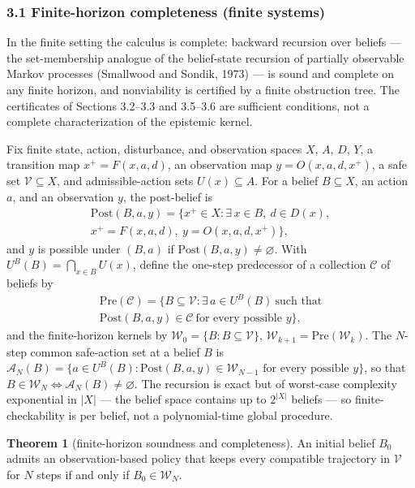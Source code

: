 \documentclass[10pt,twocolumn]{article}
\theoremstyle{definition}
\newtheorem{theorem}{Theorem}
\begin{document}
\subsubsection{3.1 Finite-horizon completeness (finite systems)}\label{finite-horizon-completeness}

In the finite setting the calculus is complete: backward recursion over beliefs --- the set-membership analogue of the belief-state recursion of partially observable Markov processes (Smallwood and Sondik, 1973) --- is sound and complete on any finite horizon, and nonviability is certified by a finite obstruction tree. The certificates of Sections 3.2--3.3 and 3.5--3.6 are sufficient conditions, not a complete characterization of the epistemic kernel.

Fix finite state, action, disturbance, and observation spaces \(X\),
\(A\), \(D\), \(Y\), a transition map \(x^+ = F(x,a,d)\), an observation
map \(y = O(x,a,d,x^+)\), a safe set \(\mathcal V\subseteq X\), and
admissible-action sets \(U(x)\subseteq A\). For a belief \(B\subseteq X\),
an action \(a\), and an observation \(y\), the post-belief is
\[
\begin{gathered}
\mathrm{Post}(B,a,y) = \bigl\{ x^+\in X : \exists\, x\in B,\ d\in D(x), \\
x^+ = F(x,a,d),\ y = O(x,a,d,x^+) \bigr\},
\end{gathered}
\]
and \(y\) is possible under \((B,a)\) if \(\mathrm{Post}(B,a,y)\neq\varnothing\).
With \(U^B(B)=\bigcap_{x\in B}U(x)\), define the one-step predecessor of a
collection \(\mathcal C\) of beliefs by
\[
\begin{gathered}
\mathrm{Pre}(\mathcal C) = \bigl\{ B\subseteq\mathcal V : \exists\, a\in U^B(B)\ \text{such that}\\
\mathrm{Post}(B,a,y)\in\mathcal C\ \text{for every possible } y \bigr\},
\end{gathered}
\]
and the finite-horizon kernels by \(\mathcal W_0 = \{B : B\subseteq\mathcal V\}\),
\(\mathcal W_{k+1} = \mathrm{Pre}(\mathcal W_k)\).
The \(N\)-step common safe-action set at a belief \(B\) is
\(\mathcal{A}_N(B) = \bigl\{ a \in U^B(B) : \mathrm{Post}(B,a,y) \in \mathcal W_{N-1} \text{ for every possible } y \bigr\}\),
so that \(B \in \mathcal W_N \iff \mathcal{A}_N(B) \neq \varnothing\). The recursion is exact but of worst-case complexity exponential in
\(|X|\) --- the belief space contains up to \(2^{|X|}\) beliefs --- so
finite-checkability is per belief, not a polynomial-time global procedure.

\begin{theorem}[finite-horizon soundness and completeness]\label{thm:finite-horizon}
An initial belief \(B_0\) admits an observation-based policy that keeps
every compatible trajectory in \(\mathcal V\) for \(N\) steps if and only
if \(B_0\in\mathcal W_N\).
\end{theorem}
\end{document}

